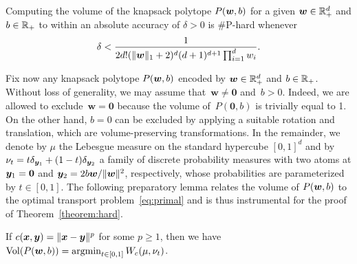 \documentclass[11pt, a4paper, oneside, reqno]{article}
\begin{document}
	
	
	
	
	\begin{lemma}
		\label{lemma:Grani}
		Computing the volume of the knapsack polytope $P( \boldsymbol{w}, b)$ for a given $\boldsymbol{w}\in \mathbb{R}^d_+$ and $ b \in \mathbb{R}_+$ to within an absolute accuracy of $\delta>0$ is $\#$P-hard
		whenever 
		\begin{equation}
		\label{eq:Granis-delta}
		\delta <\frac{1}{ {2d!(\|\boldsymbol{w}\|_1+2)^d(d+1)^{d+1}\prod_{i = 1}^{d}w_i}}.
		\end{equation}
	\end{lemma}
	Fix now any knapsack polytope $P( \boldsymbol{w}, b)$ encoded by $\boldsymbol{w}\in \mathbb{R}_+^d$ {\color{black}and $ b \in  \mathbb{R}_+$. Without loss of generality, we may assume that~$\bm w \neq \bm 0$ and~$b > 0$. Indeed, we are allowed to exclude~$\bm w = \bm 0 $ because the volume of~$P(\bm  0, b) $ is trivially equal to 1. On the other hand, $b= 0$ can be excluded by applying a suitable rotation and translation, which are volume-preserving transformations.} In the remainder, we denote by $\mu$ the Lebesgue measure on the standard hypercube $[0,1]^d$ and by ${\nu}_ t  = t \delta_{\boldsymbol y_1} + (1-t) \delta_{\boldsymbol y_2}$ a family of discrete probability measures with two atoms at $\boldsymbol y_1=\boldsymbol 0$ and $\boldsymbol y_2=2b\boldsymbol{w}/ \|\boldsymbol w\|^2$, respectively, whose probabilities are parameterized by $t \in [0, 1]$.
	The following preparatory lemma relates the volume of $P( \boldsymbol{{w}},b)$ to the optimal transport problem~\eqref{eq:primal} and is thus instrumental for the proof of Theorem~\ref{theorem:hard}.
	\begin{lemma}
		\label{lem:vol}
		If $c(\boldsymbol x, \boldsymbol y)=\|\boldsymbol x- \boldsymbol y \|^p$ for some $p\ge 1$, then we have $\mathop{\rm Vol}(P( \boldsymbol{{w}},b)) = \operatorname*{argmin}_{ t  \in [0,1]} W_c(\mu,  {\nu}_ t )$. 
	\end{lemma}
\end{document}
